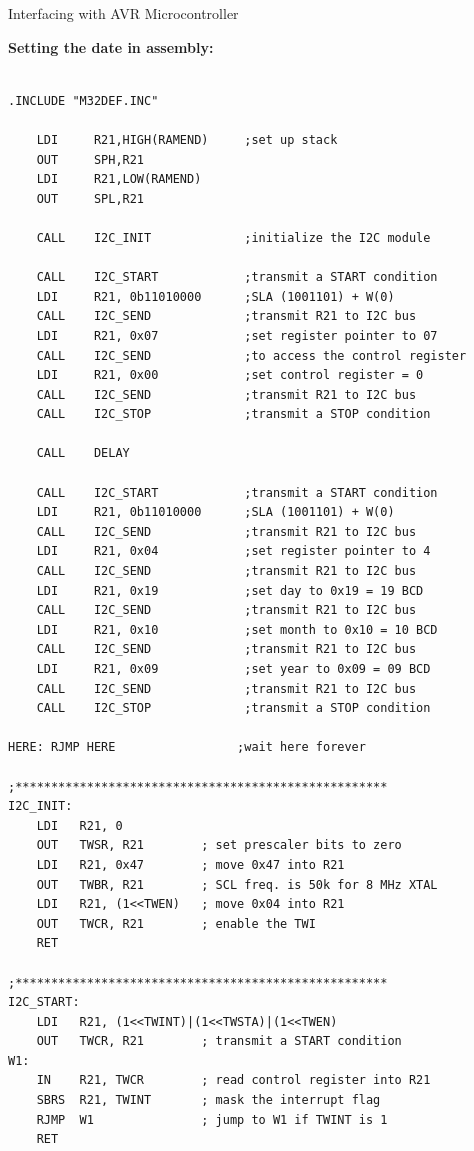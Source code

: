 \documentclass[11pt]{beamer}
\begin{document}
\begin{frame}{Interfacing with AVR Microcontroller}
        \framebreak

        \textbf{\large Setting the date in assembly:}
        \\~\\
        \begin{verbatim}
.INCLUDE "M32DEF.INC"

    LDI     R21,HIGH(RAMEND)     ;set up stack
    OUT     SPH,R21
    LDI     R21,LOW(RAMEND)
    OUT     SPL,R21

    CALL    I2C_INIT             ;initialize the I2C module

    CALL    I2C_START            ;transmit a START condition
    LDI     R21, 0b11010000      ;SLA (1001101) + W(0)
    CALL    I2C_SEND             ;transmit R21 to I2C bus
    LDI     R21, 0x07            ;set register pointer to 07
    CALL    I2C_SEND             ;to access the control register
    LDI     R21, 0x00            ;set control register = 0
    CALL    I2C_SEND             ;transmit R21 to I2C bus
    CALL    I2C_STOP             ;transmit a STOP condition

    CALL    DELAY

    CALL    I2C_START            ;transmit a START condition
    LDI     R21, 0b11010000      ;SLA (1001101) + W(0)
    CALL    I2C_SEND             ;transmit R21 to I2C bus
    LDI     R21, 0x04            ;set register pointer to 4
    CALL    I2C_SEND             ;transmit R21 to I2C bus
    LDI     R21, 0x19            ;set day to 0x19 = 19 BCD
    CALL    I2C_SEND             ;transmit R21 to I2C bus
    LDI     R21, 0x10            ;set month to 0x10 = 10 BCD
    CALL    I2C_SEND             ;transmit R21 to I2C bus
    LDI     R21, 0x09            ;set year to 0x09 = 09 BCD
    CALL    I2C_SEND             ;transmit R21 to I2C bus
    CALL    I2C_STOP             ;transmit a STOP condition

HERE: RJMP HERE                 ;wait here forever

;****************************************************
I2C_INIT:
    LDI   R21, 0
    OUT   TWSR, R21        ; set prescaler bits to zero
    LDI   R21, 0x47        ; move 0x47 into R21
    OUT   TWBR, R21        ; SCL freq. is 50k for 8 MHz XTAL
    LDI   R21, (1<<TWEN)   ; move 0x04 into R21
    OUT   TWCR, R21        ; enable the TWI
    RET

;****************************************************
I2C_START:
    LDI   R21, (1<<TWINT)|(1<<TWSTA)|(1<<TWEN)
    OUT   TWCR, R21        ; transmit a START condition
W1:
    IN    R21, TWCR        ; read control register into R21
    SBRS  R21, TWINT       ; mask the interrupt flag
    RJMP  W1               ; jump to W1 if TWINT is 1
    RET


\end{verbatim}
\end{frame}
\end{document}
